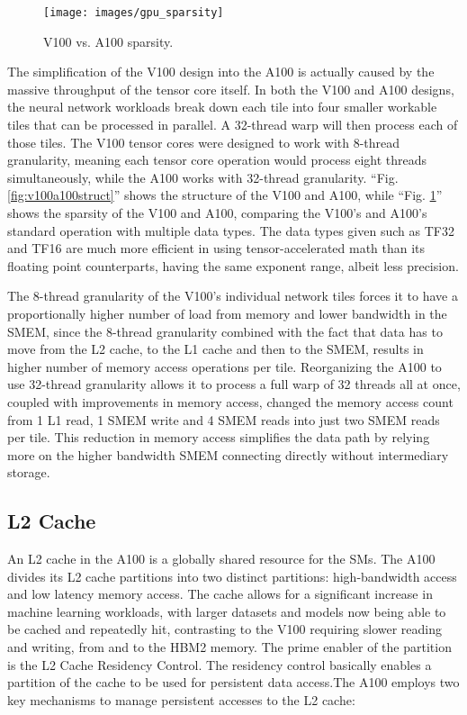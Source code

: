 \begin{figure}[htbp!]
    \centerline{\texttt{[image: images/gpu\_sparsity]}}
    \caption{V100 vs. A100 sparsity.}
    \label{fig:v100a100spars}
\end{figure}

The simplification of the V100 design into the A100 is actually caused by the massive throughput of the tensor core itself.
In both the V100 and A100 designs, the neural network workloads break down each tile into four smaller workable tiles that can be processed in parallel.
A 32-thread warp will then process each of those tiles.
The V100 tensor cores were designed to work with 8-thread granularity, meaning each tensor core operation would process eight threads simultaneously, while the A100 works with 32-thread granularity.
``Fig. \ref{fig:v100a100struct}'' shows the structure of the V100 and A100, while ``Fig. \ref{fig:v100a100spars}'' shows the sparsity of the V100 and A100, comparing the V100’s and A100’s standard operation with multiple data types.
The data types given such as TF32 and TF16 are much more efficient in using tensor-accelerated math than its floating point counterparts, having the same exponent range, albeit less precision.

The 8-thread granularity of the V100's individual network tiles forces it to have a proportionally higher number of load from memory and lower bandwidth in the SMEM, since the 8-thread granularity combined with the fact that data has to move from the L2 cache, to the L1 cache and then to the SMEM, results in higher number of memory access operations per tile.
Reorganizing the A100 to use 32-thread granularity allows it to process a full warp of 32 threads all at once, coupled with improvements in memory access, changed the memory access count from 1 L1 read, 1 SMEM write and 4 SMEM reads into just two SMEM reads per tile.
This reduction in memory access simplifies the data path by relying more on the higher bandwidth SMEM connecting directly without intermediary storage.

\subsection{L2 Cache}
\label{subsec:l2-cache}
An L2 cache in the A100 is a globally shared resource for the SMs.
The A100 divides its L2 cache partitions into two distinct partitions: high-bandwidth access and low latency memory access.
The cache allows for a significant increase in machine learning workloads, with larger datasets and models now being able to be cached and repeatedly hit, contrasting to the V100 requiring slower reading and writing, from and to the HBM2 memory.
The prime enabler of the partition is the L2 Cache Residency Control.
The residency control basically enables a partition of the cache to be used for persistent data access.The A100 employs two key mechanisms to manage persistent accesses to the L2 cache:

